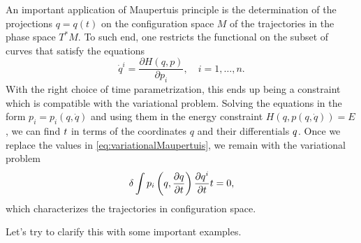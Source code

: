 \documentclass[english,fontsize=11pt,paper=a5,oneside]{scrbook}
\let\d\relax
\DeclareMathOperator{\d}{d}
\theoremstyle{definition}
\begin{document}
An important application of Maupertuis principle is the determination of the projections $q=q(t)$ on the configuration space $M$ of the trajectories in the phase space $T^*M$.
To such end, one restricts the functional on the subset of curves that satisfy the equations
\begin{equation}
    \dot q^i = \frac{\partial H(q,p)}{\partial p_i}, \quad i=1,\ldots,n.
\end{equation}
With the right choice of time parametrization, this ends up being a constraint which is compatible with the variational problem.
Solving the equations in the form $p_i = p_i(q,\dot q)$ and using them in the energy constraint $H(q, p(q,\dot q))=E$, we can find $\d t$ in terms of the coordinates $q$ and their differentials $\d q$. Once we replace the values in \eqref{eq:variationalMaupertuis}, we remain with the variational problem
\begin{equation}
    \delta \int p_i\left(q, \frac{\partial q}{\partial t}\right) \frac{\partial q^i}{\partial t} \d t = 0,
\end{equation}
which characterizes the trajectories in configuration space.

Let's try to clarify this with some important examples.
\end{document}
